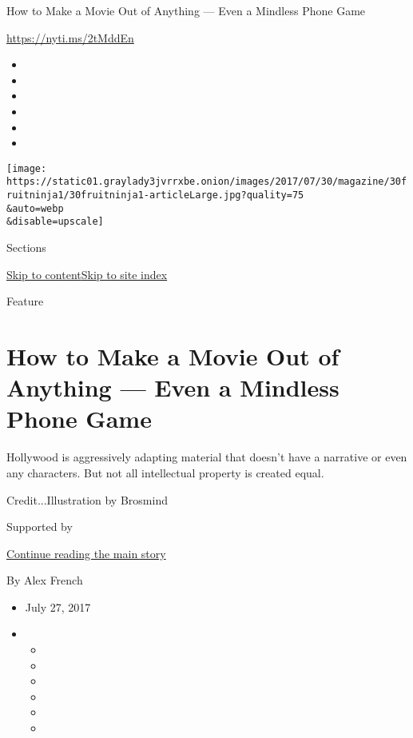 How to Make a Movie Out of Anything --- Even a Mindless Phone Game

\url{https://nyti.ms/2tMddEn}

\begin{itemize}
\item
\item
\item
\item
\item
\item
\end{itemize}

\texttt{[image: https://static01.graylady3jvrrxbe.onion/images/2017/07/30/magazine/30fruitninja1/30fruitninja1-articleLarge.jpg?quality=75\\\&auto=webp\\\&disable=upscale]}

Sections

\protect\hyperlink{site-content}{Skip to
content}\protect\hyperlink{site-index}{Skip to site index}

Feature

\hypertarget{how-to-make-a-movie-out-of-anything--even-a-mindless-phone-game}{%
\section{How to Make a Movie Out of Anything --- Even a Mindless Phone
Game}\label{how-to-make-a-movie-out-of-anything--even-a-mindless-phone-game}}

Hollywood is aggressively adapting material that doesn't have a
narrative or even any characters. But not all intellectual property is
created equal.

Credit...Illustration by Brosmind

Supported by

\protect\hyperlink{after-sponsor}{Continue reading the main story}

By Alex French

\begin{itemize}
\item
  July 27, 2017
\item
  \begin{itemize}
  \item
  \item
  \item
  \item
  \item
  \item
  \end{itemize}
\end{itemize}

